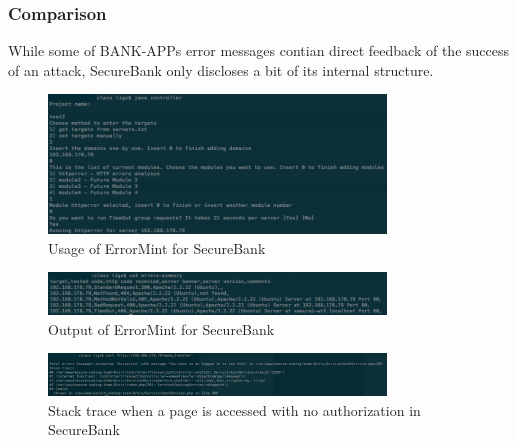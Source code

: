 \subsubsection{Comparison}
While some of BANK-APPs error messages contian direct feedback of the success of an attack, SecureBank only discloses a bit of its internal structure.
\begin{figure}[p]
    \centering
    \includegraphics[width=0.8\textwidth]{figures/OTG-ERR-001-1.png}
    \caption{Usage of ErrorMint for SecureBank}
    \label{fig:OTG_ERR_001_1}
\end{figure}
\begin{figure}[p]
    \centering
    \includegraphics[width=0.8\textwidth]{figures/OTG-ERR-001-2.png}
    \caption{Output of ErrorMint for SecureBank}
    \label{fig:OTG_ERR_001_2}
\end{figure}
\begin{figure}[p]
    \centering
    \includegraphics[width=0.8\textwidth]{figures/OTG-ERR-001-3.png}
    \caption{Stack trace when a page is accessed with no authorization in SecureBank}
    \label{fig:OTG_ERR_001_3}
\end{figure}
\clearpage